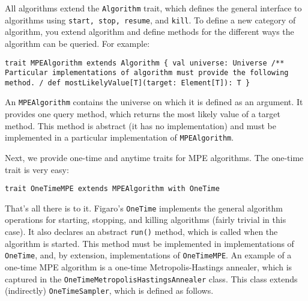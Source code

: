 All algorithms extend the \texttt{Algorithm} trait, which defines the general interface to algorithms using \texttt{start, stop,  resume}, and \texttt{kill}. To define a new category of algorithm, you extend algorithm and define methods for the different ways the algorithm can be queried. For example:


\begin{flushleft}
\texttt{trait MPEAlgorithm extends Algorithm \{
\newline val universe: Universe
\newline \tab /** 
\newline \tab * Particular implementations of algorithm must provide the following method.
\newline \tab */
\newline \tab def mostLikelyValue[T](target: Element[T]): T
\newline \}
}
\end{flushleft}

An \texttt{MPEAlgorithm} contains the universe on which it is defined as an argument. It provides one query method, which returns the most likely value of a target method. This method is abstract (it has no implementation) and must be implemented in a particular implementation of  \texttt{MPEAlgorithm}.

Next, we provide one-time and anytime traits for MPE algorithms. The one-time trait is very easy:

\begin{flushleft}
\texttt{trait OneTimeMPE extends MPEAlgorithm with OneTime}
\end{flushleft}

That's all there is to it. Figaro's \texttt{OneTime} implements the general algorithm operations for starting, stopping, and killing algorithms (fairly trivial in this case). It also declares an abstract \texttt{run()} method, which is called when the algorithm is started. This method must be implemented in implementations of \texttt{OneTime}, and, by extension, implementations of \texttt{OneTimeMPE}. An example of a one-time MPE algorithm is a one-time Metropolis-Hastings annealer, which is captured in the \texttt{OneTimeMetropolisHastingsAnnealer} class. This class extends (indirectly) \texttt{OneTimeSampler}, which is defined as follows.

